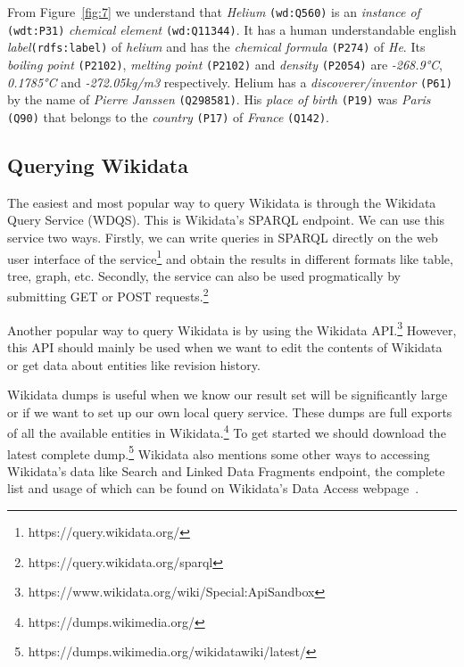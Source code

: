 From Figure~\ref{fig:7} we understand that \textit{Helium} \texttt{(wd:Q560)} is an \textit{instance of} \texttt{(wdt:P31)} \textit{chemical element} \texttt{(wd:Q11344)}. It has a human understandable english \textit{label}\texttt{(rdfs:label)} of \textit{helium} and has the \textit{chemical formula} \texttt{(P274)} of \textit{He}. Its \textit{boiling point} \texttt{(P2102)}, \textit{melting point} \texttt{(P2102)} and \textit{density} \texttt{(P2054)} are \textit{-268.9°C}, \textit{0.1785°C} and \textit{-272.05kg/m3} respectively. Helium has a \textit{discoverer/inventor} \texttt{(P61)} by the name of \textit{Pierre Janssen} \texttt{(Q298581)}. His \textit{place of birth} \texttt{(P19)} was \textit{Paris} \texttt{(Q90)} that belongs to the \textit{country} \texttt{(P17)} of \textit{France} \texttt{(Q142)}.

\subsection{Querying Wikidata}

The easiest and most popular way to query Wikidata is through the Wikidata Query Service (WDQS). This is Wikidata's SPARQL endpoint. We can use this service two ways. Firstly, we can write queries in SPARQL directly on the web user interface of the service\footnote{https://query.wikidata.org/} and obtain the results in different formats like table, tree, graph, etc. Secondly, the service can also be used progmatically by submitting GET or POST requests.\footnote{https://query.wikidata.org/sparql}

Another popular way to query Wikidata is by using the Wikidata API.\footnote{https://www.wikidata.org/wiki/Special:ApiSandbox} However, this API should mainly be used when we want to edit the contents of Wikidata or get data about entities like revision history.

Wikidata dumps is useful when we know our result set will be significantly large or if we want to set up our own local query service. These dumps are full exports of all the available entities in Wikidata.\footnote{https://dumps.wikimedia.org/} To get started we should download the latest complete dump.\footnote{https://dumps.wikimedia.org/wikidatawiki/latest/} Wikidata also mentions some other ways to accessing Wikidata's data like Search and Linked Data Fragments endpoint, the complete list and usage of which can be found on Wikidata's Data Access webpage~\cite{Wikidata2022}.



